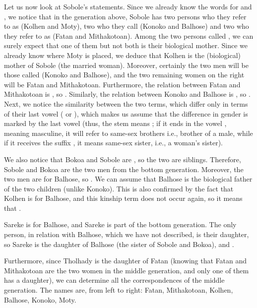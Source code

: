 \begin{refsection}
\begin{mysolution}
Let us now look at Sobole's statements. Since we already know the words for  and , we notice that in the generation above, Sobole has two persons who they refer to as   (Kolhen and Moty), two who they call   (Konoko and Balhose) and two who they refer to as  (Fatan and Mithakotoan). Among the two persons called , we can surely expect that one of them but not both is their biological mother. Since we already know where Moty is placed, we deduce that Kolhen is the (biological) mother of Sobole (the married woman). Moreover, certainly the two men will be those called  (Konoko and Balhose), and the two remaining women on the right will be Fatan and Mithakotoan. Furthermore, the relation between Fatan and Mithakotoan is , so . Similarly, the relation between Konoko and Balhose is , so . Next, we notice the similarity between the two terms, which differ only in terms of their last vowel ( or ), which makes us assume that the difference in gender is marked by the last vowel (thus, the stem  means ; if it ends in the vowel , meaning masculine, it will refer to same-sex brothers i.e., brother of a male, while if it receives the suffix , it means same-sex sister, i.e., a woman's sister).

We also notice that Bokoa and Sobole are , so the two are siblings. Therefore, Sobole and Bokoa are the two men from the bottom generation. Moreover, the two men are  for Balhose, so . We can assume that Balhose is the biological father of the two children (unlike Konoko). This is also confirmed by the fact that Kolhen is  for Balhose, and this kinship term does not occur again, so it means that .

Sareke is  for Balhose, and Sareke is part of the bottom generation. The only person, in relation with Balhose, which we have not described, is their daughter, so Sareke is the daughter of Balhose (the sister of Sobole and Bokoa), and .

Furthermore, since Tholhady is the daughter of Fatan (knowing that Fatan and Mithakotoan are the two women in the middle generation, and only one of them has a daughter), we can determine all the correspondences of the middle generation. The names are, from left to right: Fatan, Mithakotoan, Kolhen, Balhose, Konoko, Moty.


\end{mysolution}
\end{refsection}
